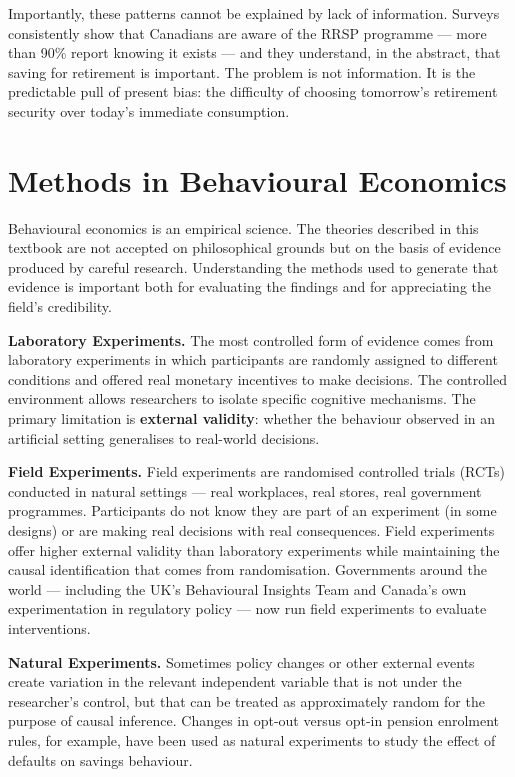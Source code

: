 \documentclass[12pt, letterpaper]{article}
\begin{document}
Importantly, these patterns cannot be explained by lack of information. Surveys consistently show that Canadians are aware of the RRSP programme --- more than 90\% report knowing it exists --- and they understand, in the abstract, that saving for retirement is important. The problem is not information. It is the predictable pull of present bias: the difficulty of choosing tomorrow's retirement security over today's immediate consumption.

\medskip


\section{Methods in Behavioural Economics}


Behavioural economics is an empirical science. The theories described in this textbook are not accepted on philosophical grounds but on the basis of evidence produced by careful research. Understanding the methods used to generate that evidence is important both for evaluating the findings and for appreciating the field's credibility.

\textbf{Laboratory Experiments.} The most controlled form of evidence comes from laboratory experiments in which participants are randomly assigned to different conditions and offered real monetary incentives to make decisions. The controlled environment allows researchers to isolate specific cognitive mechanisms. The primary limitation is \textbf{external validity}: whether the behaviour observed in an artificial setting generalises to real-world decisions.

\textbf{Field Experiments.} Field experiments are randomised controlled trials (RCTs) conducted in natural settings --- real workplaces, real stores, real government programmes. Participants do not know they are part of an experiment (in some designs) or are making real decisions with real consequences. Field experiments offer higher external validity than laboratory experiments while maintaining the causal identification that comes from randomisation. Governments around the world --- including the UK's Behavioural Insights Team and Canada's own experimentation in regulatory policy --- now run field experiments to evaluate interventions.

\textbf{Natural Experiments.} Sometimes policy changes or other external events create variation in the relevant independent variable that is not under the researcher's control, but that can be treated as approximately random for the purpose of causal inference. Changes in opt-out versus opt-in pension enrolment rules, for example, have been used as natural experiments to study the effect of defaults on savings behaviour.
\end{document}
